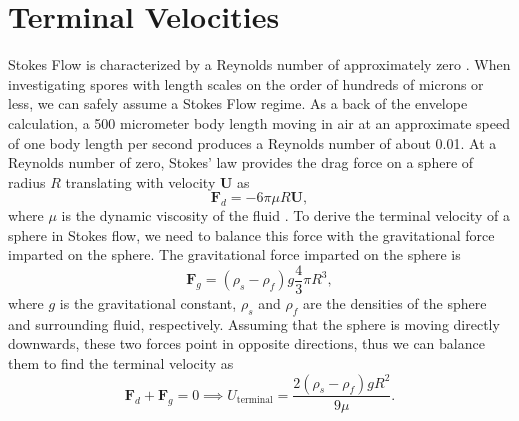 \documentclass{article}
\def\U{\mathbf{U}}
\def\F{\mathbf{F}}
\begin{document}
\section{Terminal Velocities}
Stokes Flow is characterized by a Reynolds number of approximately zero \cite{k&k}. When investigating spores with length scales on the order of hundreds of microns or less, we can safely assume a Stokes Flow regime. As a back of the envelope calculation, a 500 micrometer body length moving in air at an approximate speed of one body length per second produces a Reynolds number of about 0.01. At a Reynolds number of zero, Stokes' law provides the drag force on a sphere of radius $R$ translating with velocity $\U$ as
\begin{equation}
    \F_d = -6\pi\mu R\U,
\end{equation}
where $\mu$ is the dynamic viscosity of the fluid \cite{k&k}. To derive the terminal velocity
of a sphere in Stokes flow, we need to balance this force with the gravitational force imparted on the sphere. 
The gravitational force imparted on the sphere is 
\begin{equation}
    \F_g = (\rho_s - \rho_f)g\frac{4}{3}\pi R^3,
\end{equation}
where $g$ is the gravitational constant, $\rho_s$ and $\rho_f$ are the densities
of the sphere and surrounding fluid, respectively. Assuming that the sphere is moving directly downwards, these two
forces point in opposite directions, thus we can balance them to find the terminal velocity as 
\begin{equation}
    \F_d + \F_g = 0 \implies U_{\text{terminal}} = \frac{2(\rho_s - \rho_f)gR^2}{9\mu}.
\end{equation}
\end{document}

